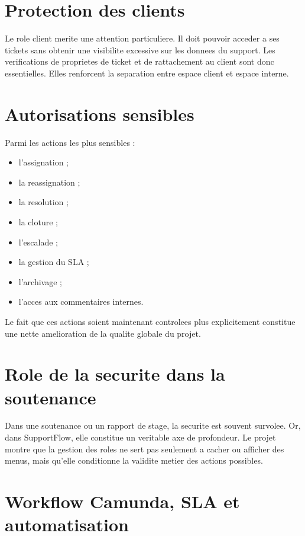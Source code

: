 \section{Protection des clients}

Le role client merite une attention particuliere. Il doit pouvoir acceder a ses tickets sans obtenir une visibilite excessive sur les donnees du support. Les verifications de proprietes de ticket et de rattachement au client sont donc essentielles. Elles renforcent la separation entre espace client et espace interne.

\section{Autorisations sensibles}

Parmi les actions les plus sensibles :

\begin{itemize}[leftmargin=1.2cm]
  \item l'assignation ;
  \item la reassignation ;
  \item la resolution ;
  \item la cloture ;
  \item l'escalade ;
  \item la gestion du SLA ;
  \item l'archivage ;
  \item l'acces aux commentaires internes.
\end{itemize}

Le fait que ces actions soient maintenant controlees plus explicitement constitue une nette amelioration de la qualite globale du projet.

\section{Role de la securite dans la soutenance}

Dans une soutenance ou un rapport de stage, la securite est souvent survolee. Or, dans SupportFlow, elle constitue un veritable axe de profondeur. Le projet montre que la gestion des roles ne sert pas seulement a cacher ou afficher des menus, mais qu'elle conditionne la validite metier des actions possibles.



\section{Workflow Camunda, SLA et automatisation}

